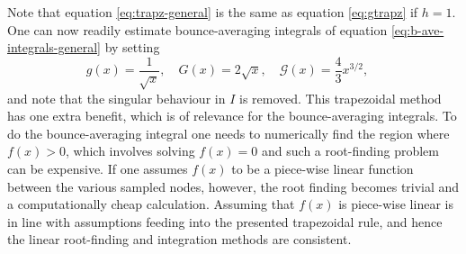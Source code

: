 Note that equation \eqref{eq:trapz-general} is the same as equation \eqref{eq:gtrapz} if $h=1$. One can now readily estimate bounce-averaging integrals of equation \eqref{eq:b-ave-integrals-general} by setting
\begin{equation}
    g(x) = \frac{1}{\sqrt{x}}, \quad G(x) = 2\sqrt{x}, \quad \mathcal{G}(x) = \frac{4}{3} x^{3/2},
 \quad \end{equation}
and note that the singular behaviour in $I$ is removed. This trapezoidal method has one extra benefit, which is of relevance for the bounce-averaging integrals. To do the bounce-averaging integral one needs to numerically find the region where $f(x)>0$, which involves solving $f(x)=0$ and such a root-finding problem can be expensive. If one assumes $f(x)$ to be a piece-wise linear function between the various sampled nodes, however, the root finding becomes trivial and a computationally cheap calculation. Assuming that $f(x)$ is piece-wise linear is in line with assumptions feeding into the presented trapezoidal rule, and hence the linear root-finding and integration methods are consistent.
